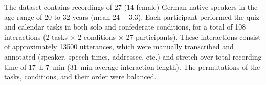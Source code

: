 The dataset contains recordings of 27 (14 female) German native speakers in the age range of 20 to 32 years (mean 24~$\pm$3.3).
Each participant performed the quiz and calendar tasks in both solo and confederate conditions, for a total of 108 interactions (2 tasks $\times$ 2 conditions $\times$ 27 participants).
These interactions consist of approximately \num{13500} utterances, which were manually transcribed and annotated (speaker, speech times, addressee, etc.) and stretch over total recording time of \SI{17}{\hour} \SI{7}{\minute} (\SI{31}{\minute} average interaction length).
The permutations of the tasks, conditions, and their order were balanced.




